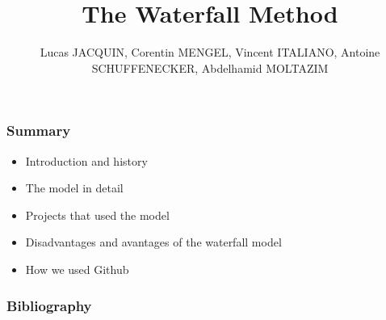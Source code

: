 \documentclass[handout]{beamer}
\title{The Waterfall Method}
\author{Lucas JACQUIN, Corentin MENGEL, Vincent ITALIANO, Antoine SCHUFFENECKER, Abdelhamid MOLTAZIM}
\begin{document}
\begin{frame}    
    
    \maketitle

\end{frame}

\begin{frame}
    
    \frametitle{Summary}
    \begin{itemize}
        \setlength\itemsep{1em}
        \item Introduction and history \pause
        \item The model in detail \pause
        \item Projects that used the model \pause
        \item Disadvantages and avantages of the waterfall model \pause
        \item How we used Github 
    \end{itemize}
\end{frame}

\nocite{*}
\begin{frame}
    \frametitle{Bibliography}

    
        

\end{frame}
\end{document}
